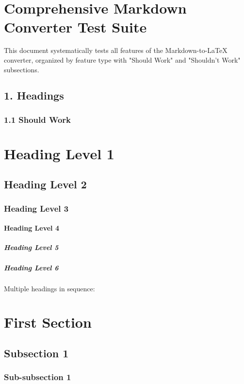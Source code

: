 \documentclass{article}
\begin{document}
\section{ Comprehensive Markdown Converter Test Suite}

This document systematically tests all features of the Markdown-to-LaTeX converter, organized by feature type with "Should Work" and "Shouldn't Work" subsections.

\noindent\hrulefill

\subsection{ 1. Headings}

\subsubsection{ 1.1 Should Work}

\section{ Heading Level 1}

\subsection{ Heading Level 2}

\subsubsection{ Heading Level 3}

\paragraph{ Heading Level 4}

\subparagraph{ Heading Level 5}

\subparagraph{ Heading Level 6}

Multiple headings in sequence:

\section{ First Section}

\subsection{ Subsection 1}

\subsubsection{ Sub-subsection 1}
\end{document}
